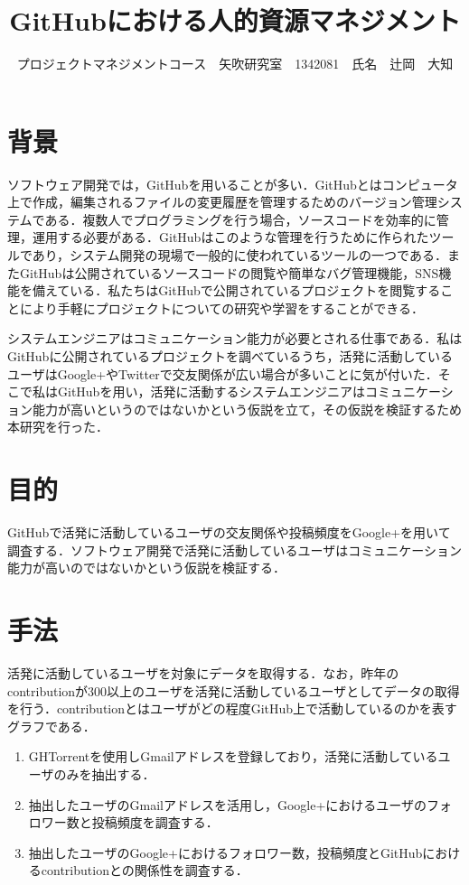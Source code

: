 \documentclass[uplatex,twocolumn,dvipdfmx]{jsarticle}
\title{\vspace{-5mm}\fontsize{14pt}{0pt}\selectfont GitHubにおける人的資源マネジメント}
\author{\normalsize プロジェクトマネジメントコース　矢吹研究室　1342081　氏名　辻岡　大知}
\date{}
\begin{document}
\fontsize{10.5pt}{\baselineskip}\selectfont
\maketitle





\section{背景}

ソフトウェア開発では，GitHubを用いることが多い．GitHubとはコンピュータ上で作成，編集されるファイルの変更履歴を管理するためのバージョン管理システムである．複数人でプログラミングを行う場合，ソースコードを効率的に管理，運用する必要がある．GitHubはこのような管理を行うために作られたツールであり，システム開発の現場で一般的に使われているツールの一つである\cite{a}．またGitHubは公開されているソースコードの閲覧や簡単なバグ管理機能，SNS機能を備えている．私たちはGitHubで公開されているプロジェクトを閲覧することにより手軽にプロジェクトについての研究や学習をすることができる．

システムエンジニアはコミュニケーション能力が必要とされる仕事である．私はGitHubに公開されているプロジェクトを調べているうち，活発に活動しているユーザはGoogle+やTwitterで交友関係が広い場合が多いことに気が付いた．そこで私はGitHubを用い，活発に活動するシステムエンジニアはコミュニケーション能力が高いというのではないかという仮説を立て，その仮説を検証するため本研究を行った．


\section{目的}

GitHubで活発に活動しているユーザの交友関係や投稿頻度をGoogle+を用いて調査する．ソフトウェア開発で活発に活動しているユーザはコミュニケーション能力が高いのではないかという仮説を検証する．

\section{手法}

活発に活動しているユーザを対象にデータを取得する．なお，昨年のcontributionが300以上のユーザを活発に活動しているユーザとしてデータの取得を行う．contributionとはユーザがどの程度GitHub上で活動しているのかを表すグラフである．

\begin{enumerate}
 \item GHTorrent\cite{GHTorrent}を使用しGmailアドレスを登録しており，活発に活動しているユーザのみを抽出する．
 \item 抽出したユーザのGmailアドレスを活用し，Google+におけるユーザのフォロワー数と投稿頻度を調査する．
 \item 抽出したユーザのGoogle+におけるフォロワー数，投稿頻度とGitHubにおけるcontributionとの関係性を調査する．
\end{enumerate}
\end{document}
